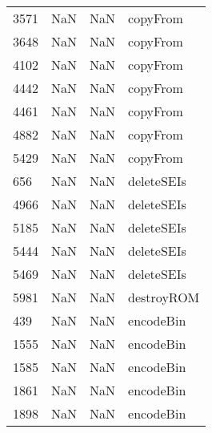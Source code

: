 \begin{tabular}{llll}
3571 &                   NaN &                        NaN &                                  copyFrom \\
3648 &                   NaN &                        NaN &                                  copyFrom \\
4102 &                   NaN &                        NaN &                                  copyFrom \\
4442 &                   NaN &                        NaN &                                  copyFrom \\
4461 &                   NaN &                        NaN &                                  copyFrom \\
4882 &                   NaN &                        NaN &                                  copyFrom \\
5429 &                   NaN &                        NaN &                                  copyFrom \\
656  &                   NaN &                        NaN &                                deleteSEIs \\
4966 &                   NaN &                        NaN &                                deleteSEIs \\
5185 &                   NaN &                        NaN &                                deleteSEIs \\
5444 &                   NaN &                        NaN &                                deleteSEIs \\
5469 &                   NaN &                        NaN &                                deleteSEIs \\
5981 &                   NaN &                        NaN &                                destroyROM \\
439  &                   NaN &                        NaN &                                 encodeBin \\
1555 &                   NaN &                        NaN &                                 encodeBin \\
1585 &                   NaN &                        NaN &                                 encodeBin \\
1861 &                   NaN &                        NaN &                                 encodeBin \\
1898 &                   NaN &                        NaN &                                 encodeBin \\

\end{tabular}
